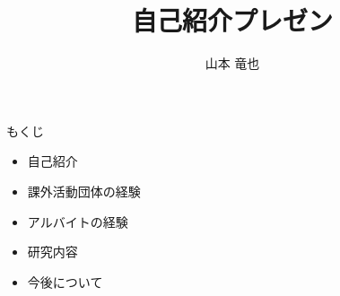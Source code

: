 \documentclass[12pt, unicode]{beamer}
\title{自己紹介プレゼン}
\author{山本 竜也}
\institute[]{名古屋工業大学大学院\\工学専攻情報工学系プログラム}
\date{}
\begin{document}
\begin{frame}
  \maketitle
\end{frame}

\begin{frame}{もくじ}
  \begin{itemize}
    \item 自己紹介
    \item 課外活動団体の経験
    \item アルバイトの経験
    \item 研究内容
    \item 今後について
  \end{itemize}
\end{frame}
\end{document}
